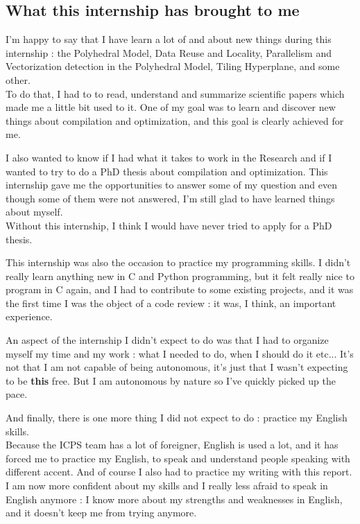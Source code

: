 \documentclass[paper=a4, fontsize=11pt]{scrartcl}
\numberwithin{equation}{section}        %
\numberwithin{figure}{section}          %
\numberwithin{table}{section}               %
\begin{document}
    \subsection{What this internship has brought to me}
        I'm happy to say that I have learn a lot of and about new things during this internship :
        the Polyhedral Model, Data Reuse and Locality, Parallelism and Vectorization detection
        in the Polyhedral Model, Tiling Hyperplane, and some other.\\
        To do that, I had to to read, understand and summarize scientific papers which made
        me a little bit used to it.
        One of my goal was to learn and discover new things about compilation and optimization,
        and this goal is clearly achieved for me.

        I also wanted to know if I had what it takes to work in the Research and if I wanted
        to try to do a PhD thesis about compilation and optimization. This internship gave me
        the opportunities to answer some of my question and even though some of them were
        not answered, I'm still glad to have learned things about myself.\\
        Without this internship, I think I would have never tried to apply for a PhD thesis.

        This internship was also the occasion to practice my programming skills. I didn't
        really learn anything new in C and Python programming, but it felt really nice to
        program in C again, and I had to contribute to some existing projects, and it was
        the first time I was the object of a code review : it was, I think, an important experience.

        An aspect of the internship I didn't expect to do was that I had to organize myself
        my time and my work : what I needed to do, when I should do it etc... It's not that I
        am not capable of being autonomous, it's just that I wasn't expecting to be
        \textbf{this} free. But I am autonomous by nature so I've quickly picked up the pace.

        And finally, there is one more thing I did not expect to do : practice my English skills.\\
        Because the ICPS team has a lot of foreigner, English is used a lot, and it has forced
        me to practice my English, to speak and understand people speaking with different accent.
        And of course I also had to practice my writing with this report.
        I am now more confident about my skills and I really less afraid to speak in English
        anymore : I know more about my strengths and weaknesses in English, and it doesn't
        keep me from trying anymore.
\end{document}
